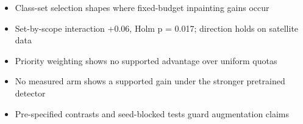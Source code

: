 \begin{itemize}
\item Class-set selection shapes where fixed-budget inpainting gains occur
\item Set-by-scope interaction +0.06, Holm p = 0.017; direction holds on satellite data
\item Priority weighting shows no supported advantage over uniform quotas
\item No measured arm shows a supported gain under the stronger pretrained detector
\item Pre-specified contrasts and seed-blocked tests guard augmentation claims
\end{itemize}
